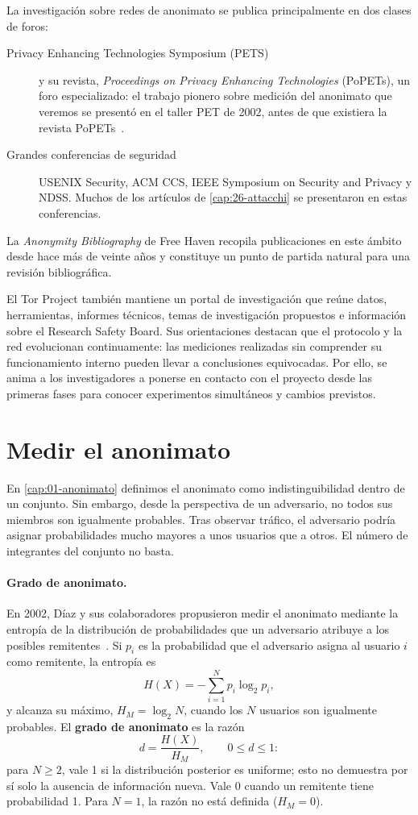 La investigación sobre redes de anonimato se publica principalmente en dos clases de foros:
\begin{description}
  \item[Privacy Enhancing Technologies Symposium (PETS)] y su revista, \emph{Proceedings on Privacy Enhancing Technologies} (PoPETs), un foro especializado: el trabajo pionero sobre medición del anonimato que veremos se presentó en el taller PET de 2002, antes de que existiera la revista PoPETs~\cite{diaz2002measuring}.
  \item[Grandes conferencias de seguridad] USENIX Security, ACM CCS, IEEE Symposium on Security and Privacy y NDSS. Muchos de los artículos de \cref{cap:26-attacchi} se presentaron en estas conferencias.
\end{description}
La \emph{Anonymity Bibliography} de Free Haven recopila publicaciones en este ámbito desde hace más de veinte años y constituye un punto de partida natural para una revisión bibliográfica.

El Tor Project también mantiene un portal de investigación que reúne datos, herramientas, informes técnicos, temas de investigación propuestos e información sobre el Research Safety Board. Sus orientaciones destacan que el protocolo y la red evolucionan continuamente: las mediciones realizadas sin comprender su funcionamiento interno pueden llevar a conclusiones equivocadas. Por ello, se anima a los investigadores a ponerse en contacto con el proyecto desde las primeras fases para conocer experimentos simultáneos y cambios previstos.

\section{Medir el anonimato}\label{sec:ric-metriche}

En \cref{cap:01-anonimato} definimos el anonimato como indistinguibilidad dentro de un conjunto. Sin embargo, desde la perspectiva de un adversario, no todos sus miembros son igualmente probables. Tras observar tráfico, el adversario podría asignar probabilidades mucho mayores a unos usuarios que a otros. El número de integrantes del conjunto no basta.

\paragraph{Grado de anonimato.} En 2002, Díaz y sus colaboradores propusieron medir el anonimato mediante la entropía de la distribución de probabilidades que un adversario atribuye a los posibles remitentes~\cite{diaz2002measuring}. Si $p_i$ es la probabilidad que el adversario asigna al usuario $i$ como remitente, la entropía es
\[ H(X) = -\sum_{i=1}^{N} p_i \log_2 p_i, \]
y alcanza su máximo, $H_M = \log_2 N$, cuando los $N$ usuarios son igualmente probables. El \textbf{grado de anonimato} es la razón
\[ d = \frac{H(X)}{H_M}, \qquad 0 \le d \le 1: \]
para $N\ge 2$, vale 1 si la distribución posterior es uniforme; esto no demuestra por sí solo la ausencia de información nueva. Vale 0 cuando un remitente tiene probabilidad 1. Para $N=1$, la razón no está definida ($H_M=0$).

